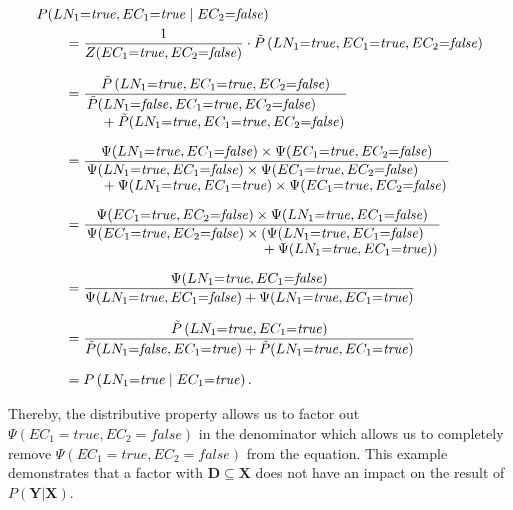 \begin{equation*}
\begin{split}
  &P(LN_1{=}\mathit{true},EC_1{=}\mathit{true}\mid EC_2{=}\mathit{false})\\
  &\hspace{2em}=\frac{1}{Z(EC_1{=}\mathit{true},EC_2{=}\mathit{false})}\cdot\tilde{P}\left(LN_1{=}\mathit{true},EC_1{=}\mathit{true},EC_2{=}\mathit{false}\right)\\[0.25cm]
  &\hspace{2em}=\frac{\tilde{P}\left(LN_1{=}\mathit{true},EC_1{=}\mathit{true},EC_2{=}\mathit{false}\right)}{\splitfrac{\tilde{P}(LN_1{=}\mathit{false},EC_1{=}\mathit{true},EC_2{=}\mathit{false})}
    {+\tilde{P}(LN_1{=}\mathit{true},EC_1{=}\mathit{true},EC_2{=}\mathit{false})}}\\[0.25cm]
  &\hspace{2em}=\frac{\Psi(LN_1{=}\mathit{true},EC_1{=}\mathit{false})\times\Psi(EC_1{=}\mathit{true},EC_2{=}\mathit{false})}{\splitfrac{\Psi(LN_1{=}\mathit{true},EC_1{=}\mathit{false})\times\Psi(EC_1{=}\mathit{true},EC_2{=}\mathit{false})}
  {+\Psi(LN_1{=}\mathit{true},EC_1{=}\mathit{true})\times\Psi(EC_1{=}\mathit{true},EC_2{=}\mathit{false})}}\\[0.25cm]
  &\hspace{2em}=\frac{\Psi(EC_1{=}\mathit{true},EC_2{=}\mathit{false})\times\Psi(LN_1{=}\mathit{true},EC_1{=}\mathit{false})}{\splitfrac{\Psi(EC_1{=}\mathit{true},EC_2{=}\mathit{false})\times(\Psi(LN_1{=}\mathit{true},EC_1{=}\mathit{false})}
  {+\Psi(LN_1{=}\mathit{true},EC_1{=}\mathit{true}))}}\\[0.25cm]
  &\hspace{2em}=\frac{\Psi(LN_1{=}\mathit{true},EC_1{=}\mathit{false})}{\Psi(LN_1{=}\mathit{true},EC_1{=}\mathit{false})+\Psi(LN_1{=}\mathit{true},EC_1{=}\mathit{true})}\\[0.25cm]
  &\hspace{2em}=\frac{\tilde{P}\left(LN_1{=}\mathit{true},EC_1{=}\mathit{true}\right)}{\tilde{P}(LN_1{=}\mathit{false},EC_1{=}\mathit{true})+\tilde{P}(LN_1{=}\mathit{true},EC_1{=}\mathit{true})}\\[0.25cm]
  &\hspace{2em}={P}\left(LN_1{=}\mathit{true}\mid EC_1{=}\mathit{true}\right).\\
\end{split}
\end{equation*}

Thereby, the distributive property allows us to factor out $\Psi(EC_1{=}\mathit{true},EC_2{=}\mathit{false})$ in the denominator which allows us to completely remove $\Psi(EC_1{=}\mathit{true},EC_2{=}\mathit{false})$ from the equation.
This example demonstrates that a \gls{factor} with $\mathbf{D}\subseteq\mathbf{X}$ does not have an impact on the result of $P(\mathbf{Y}|\mathbf{X})$.

